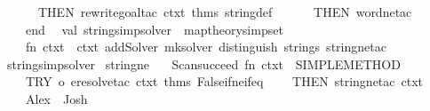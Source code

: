 \begin{isabellebody}
\ \ \ \ \ \ THEN{\isacharprime}{\kern0pt}\ rewrite{\isacharunderscore}{\kern0pt}goal{\isacharunderscore}{\kern0pt}tac\ ctxt\ {\isacharat}{\kern0pt}{\isacharbraceleft}{\kern0pt}thms\ string{\isacharunderscore}{\kern0pt}def{\isacharbraceright}{\kern0pt}\isanewline
\ \ \ \ \ \ THEN{\isacharprime}{\kern0pt}\ word{\isacharunderscore}{\kern0pt}ne{\isacharunderscore}{\kern0pt}tac\isanewline
\ \ \ \ end\isanewline
\isanewline
\ \ val\ string{\isacharunderscore}{\kern0pt}simp{\isacharunderscore}{\kern0pt}solver\ {\isacharequal}{\kern0pt}\ map{\isacharunderscore}{\kern0pt}theory{\isacharunderscore}{\kern0pt}simpset\isanewline
\ \ \ \ {\isacharparenleft}{\kern0pt}fn\ ctxt\ {\isacharequal}{\kern0pt}{\isachargreater}{\kern0pt}\ ctxt\ addSolver\ {\isacharparenleft}{\kern0pt}mk{\isacharunderscore}{\kern0pt}solver\ {\isachardoublequote}{\kern0pt}distinguish\ strings{\isachardoublequote}{\kern0pt}\ string{\isacharunderscore}{\kern0pt}ne{\isacharunderscore}{\kern0pt}tac{\isacharparenright}{\kern0pt}{\isacharparenright}{\kern0pt}\isanewline
{\isacartoucheclose}\isanewline
\isanewline
{}\isamarkupfalse%
\ {\isacartoucheopen}string{\isacharunderscore}{\kern0pt}simp{\isacharunderscore}{\kern0pt}solver{\isacartoucheclose}\isanewline
\isanewline
{}\isamarkupfalse%
\ string{\isacharunderscore}{\kern0pt}ne\ {\isacharequal}{\kern0pt}\isanewline
\ \ {\isacartoucheopen}Scan{\isachardot}{\kern0pt}succeed\ {\isacharparenleft}{\kern0pt}fn\ ctxt\ {\isacharequal}{\kern0pt}{\isachargreater}{\kern0pt}\ SIMPLE{\isacharunderscore}{\kern0pt}METHOD{\isacharprime}{\kern0pt}\ {\isacharparenleft}{\kern0pt}\isanewline
\ \ \ \ {\isacharparenleft}{\kern0pt}TRY\ o\ eresolve{\isacharunderscore}{\kern0pt}tac\ ctxt\ {\isacharat}{\kern0pt}{\isacharbraceleft}{\kern0pt}thms\ False{\isacharunderscore}{\kern0pt}if{\isacharunderscore}{\kern0pt}ne{\isacharunderscore}{\kern0pt}if{\isacharunderscore}{\kern0pt}eq{\isacharbraceright}{\kern0pt}{\isacharparenright}{\kern0pt}\isanewline
\ \ \ \ THEN{\isacharprime}{\kern0pt}\ string{\isacharunderscore}{\kern0pt}ne{\isacharunderscore}{\kern0pt}tac\ ctxt{\isacharparenright}{\kern0pt}{\isacharparenright}{\kern0pt}{\isacartoucheclose}%
\endisatagML
{\isafoldML}%
%
\isadelimML
%
\endisadelimML
\isanewline
\isanewline
\isanewline
{}\isamarkupfalse%
\isanewline
{}\isanewline
%
\isadelimproof
\ \ %
\endisadelimproof
%
\isatagproof
{}\isamarkupfalse%
\isanewline
\ \ \ \ {\isachardoublequoteopen}{\isacharat}{\kern0pt}Alex\ {\isasymnoteq}\ {\isacharat}{\kern0pt}Josh{\isachardoublequoteclose}\ \isanewline

\end{isabellebody}
